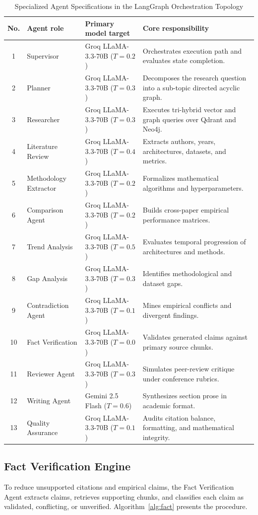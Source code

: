 \documentclass[conference]{IEEEtran}
\begin{document}
\begin{table}[!t]
\caption{Specialized Agent Specifications in the LangGraph Orchestration Topology}
\label{tab:agents}
\centering
\small
\begin{tabularx}{\textwidth}{@{}c l l X@{}}
\toprule
\textbf{No.} & \textbf{Agent role} & \textbf{Primary model target} & \textbf{Core responsibility} \\
\midrule
1 & Supervisor & Groq LLaMA-3.3-70B ($T=0.2$) & Orchestrates execution path and evaluates state completion. \\
2 & Planner & Groq LLaMA-3.3-70B ($T=0.3$) & Decomposes the research question into a sub-topic directed acyclic graph. \\
3 & Researcher & Groq LLaMA-3.3-70B ($T=0.3$) & Executes tri-hybrid vector and graph queries over Qdrant and Neo4j. \\
4 & Literature Review & Groq LLaMA-3.3-70B ($T=0.4$) & Extracts authors, years, architectures, datasets, and metrics. \\
5 & Methodology Extractor & Groq LLaMA-3.3-70B ($T=0.2$) & Formalizes mathematical algorithms and hyperparameters. \\
6 & Comparison Agent & Groq LLaMA-3.3-70B ($T=0.2$) & Builds cross-paper empirical performance matrices. \\
7 & Trend Analysis & Groq LLaMA-3.3-70B ($T=0.5$) & Evaluates temporal progression of architectures and methods. \\
8 & Gap Analysis & Groq LLaMA-3.3-70B ($T=0.3$) & Identifies methodological and dataset gaps. \\
9 & Contradiction Agent & Groq LLaMA-3.3-70B ($T=0.1$) & Mines empirical conflicts and divergent findings. \\
10 & Fact Verification & Groq LLaMA-3.3-70B ($T=0.0$) & Validates generated claims against primary source chunks. \\
11 & Reviewer Agent & Groq LLaMA-3.3-70B ($T=0.3$) & Simulates peer-review critique under conference rubrics. \\
12 & Writing Agent & Gemini 2.5 Flash ($T=0.6$) & Synthesizes section prose in academic format. \\
13 & Quality Assurance & Groq LLaMA-3.3-70B ($T=0.1$) & Audits citation balance, formatting, and mathematical integrity. \\
\bottomrule
\end{tabularx}
\end{table}

\subsection{Fact Verification Engine}
To reduce unsupported citations and empirical claims, the Fact Verification Agent extracts claims, retrieves supporting chunks, and classifies each claim as validated, conflicting, or unverified. Algorithm~\ref{alg:fact} presents the procedure.
\end{document}

